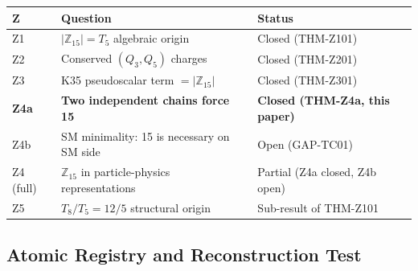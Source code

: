\documentclass[12pt, a4paper]{article}
\begin{document}
\begin{derivedbox}[title={Z-Programme status after TASK-ZC09 (Z4a)}]
{\small
\renewcommand{\arraystretch}{1.30}
\begin{tabular}{p{0.8cm} p{7.5cm} p{3.5cm}}
\toprule
\textbf{Z} & \textbf{Question} & \textbf{Status} \\
\midrule
Z1 & $|\mathbb{Z}_{15}| = T_5$ algebraic origin
  & Closed (THM-Z101) \\
Z2 & Conserved $(Q_3, Q_5)$ charges
  & Closed (THM-Z201) \\
Z3 & K35 pseudoscalar term $= |\mathbb{Z}_{15}|$
  & Closed (THM-Z301) \\
\textbf{Z4a} & \textbf{Two independent chains force 15}
  & \textbf{Closed (THM-Z4a, this paper)} \\
Z4b & SM minimality: 15 is necessary on SM side
  & Open (GAP-TC01) \\
Z4 (full) & $\mathbb{Z}_{15}$ in particle-physics representations
  & Partial (Z4a closed, Z4b open) \\
Z5 & $T_8/T_5 = 12/5$ structural origin
  & Sub-result of THM-Z101 \\
\bottomrule
\end{tabular}
}
\end{derivedbox}

\subsection{Atomic Registry and Reconstruction Test}
\label{sec:registry}
\end{document}
